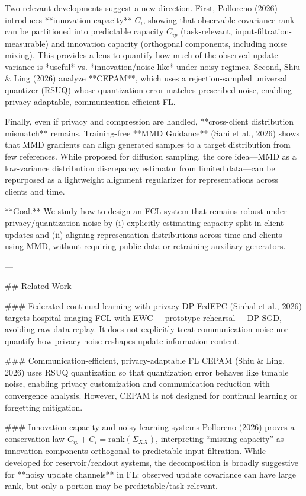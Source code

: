 Two relevant developments suggest a new direction. First, Polloreno (2026) introduces **innovation capacity** \(C_i\), showing that observable covariance rank can be partitioned into predictable capacity \(C_{ip}\) (task-relevant, input-filtration-measurable) and innovation capacity (orthogonal components, including noise mixing). This provides a lens to quantify how much of the observed update variance is *useful* vs. *innovation/noise-like* under noisy regimes. Second, Shiu & Ling (2026) analyze **CEPAM**, which uses a rejection-sampled universal quantizer (RSUQ) whose quantization error matches prescribed noise, enabling privacy-adaptable, communication-efficient FL.

Finally, even if privacy and compression are handled, **cross-client distribution mismatch** remains. Training-free **MMD Guidance** (Sani et al., 2026) shows that MMD gradients can align generated samples to a target distribution from few references. While proposed for diffusion sampling, the core idea—MMD as a low-variance distribution discrepancy estimator from limited data—can be repurposed as a lightweight alignment regularizer for representations across clients and time.

**Goal.** We study how to design an FCL system that remains robust under privacy/quantization noise by (i) explicitly estimating capacity split in client updates and (ii) aligning representation distributions across time and clients using MMD, without requiring public data or retraining auxiliary generators.

---

## Related Work  

### Federated continual learning with privacy  
DP-FedEPC (Sinhal et al., 2026) targets hospital imaging FCL with EWC + prototype rehearsal + DP-SGD, avoiding raw-data replay. It does not explicitly treat communication noise nor quantify how privacy noise reshapes update information content.

### Communication-efficient, privacy-adaptable FL  
CEPAM (Shiu & Ling, 2026) uses RSUQ quantization so that quantization error behaves like tunable noise, enabling privacy customization and communication reduction with convergence analysis. However, CEPAM is not designed for continual learning or forgetting mitigation.

### Innovation capacity and noisy learning systems  
Polloreno (2026) proves a conservation law \(C_{ip}+C_i=\mathrm{rank}(\Sigma_{XX})\), interpreting “missing capacity” as innovation components orthogonal to predictable input filtration. While developed for reservoir/readout systems, the decomposition is broadly suggestive for **noisy update channels** in FL: observed update covariance can have large rank, but only a portion may be predictable/task-relevant.

